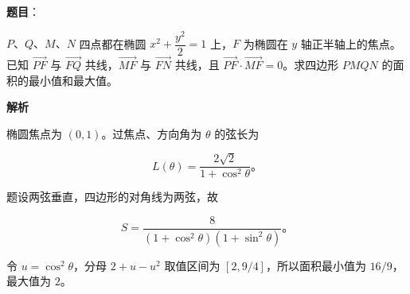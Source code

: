 \begin{answer}

\textbf{题目}：

$P\text{、}Q\text{、}M\text{、}N$ 四点都在椭圆 $x^2+\dfrac{y^2}{2}=1$ 上，$F$ 为椭圆在 $y$ 轴正半轴上的焦点。已知 $\overrightarrow{PF}$ 与 $\overrightarrow{FQ}$ 共线，$\overrightarrow{MF}$ 与 $\overrightarrow{FN}$ 共线，且 $\overrightarrow{PF}\cdot\overrightarrow{MF}=0$。求四边形 $PMQN$ 的面积的最小值和最大值。

\textbf{解析}

椭圆焦点为 $(0,1)$。过焦点、方向角为 $\theta$ 的弦长为

\nopagebreak[4]
\[
L(\theta)=\frac{2\sqrt2}{1+\cos^2\theta}\text{。}
\]

题设两弦垂直，四边形的对角线为两弦，故

\nopagebreak[4]
\[
S=\frac8{(1+\cos^2\theta)(1+\sin^2\theta)}\text{。}
\]

令 $u=\cos^2\theta$，分母 $2+u-u^2$ 取值区间为 $[2,9/4]$，所以面积最小值为 $16/9$，最大值为 $2$。


\end{answer}